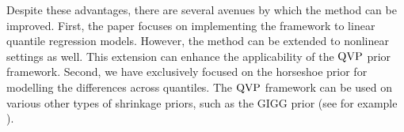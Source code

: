 Despite these advantages, there are several avenues by which the method can be improved. First, the paper focuses on implementing the framework to linear quantile regression models. However, the method can be extended to nonlinear settings as well. This extension can enhance the applicability of the $\operatorname{QVP}$ prior framework. Second, we have exclusively focused on the horseshoe prior for modelling the differences across quantiles. The $\operatorname{QVP}$ framework can be used on various other types of shrinkage priors, such as the GIGG prior (see for example \citet{kohns2025flexible}).




